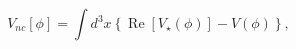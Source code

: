 \begin{equation}
V_{nc}[\phi]=\int d^{3}x\left\{  \operatorname{Re}\left[  V_{\star}\left(
\phi\right)  \right]  -V\left(  \phi\right)  \right\}  ,\label{19.2}%
\end{equation}

